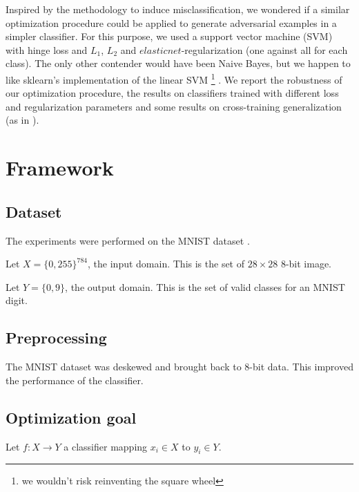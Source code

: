 \documentclass{article} %
\begin{document}
Inspired by the methodology to induce misclassification, we wondered
if a similar optimization procedure could be applied to generate adversarial
examples in a simpler classifier. For this purpose, we used a support vector machine (SVM) with hinge loss and $L_1$, $L_2$ and $elasticnet$-regularization (one against all for each class). The only other contender would have been Naive Bayes,
but we happen to like sklearn's implementation of the linear SVM \footnote{we wouldn't
risk reinventing the square wheel} \citep{pedregosa_scikit-learn:_2011}.
We report the robustness of our optimization procedure, the results on classifiers
trained with different loss and regularization parameters and some results on cross-training generalization (as in \citep{szegedy_intriguing_2013}).


\section{Framework}

\subsection{Dataset}

The experiments were performed on the MNIST dataset \citep{lecun_mnist_1998}.

Let \begin{math} X=\{0, 255\}^{784} \end{math}, the input domain.
This is the set of $28\times28$ 8-bit image.

Let \begin{math} Y = \{0, 9\} \end{math}, the output domain.
This is the set of valid classes for an MNIST digit.


\subsection{Preprocessing}

The MNIST dataset was deskewed and brought back to 8-bit data. This improved the performance of the classifier.


\subsection{Optimization goal}

Let \begin{math} f:X \rightarrow  Y \end{math} a classifier mapping $x_i \in
X$ to $y_i \in Y$.
\end{document}
